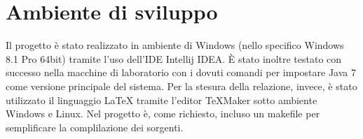 %
%
%

\section{Ambiente di sviluppo}
Il progetto \`{e} stato realizzato in ambiente di Windows (nello specifico Windows 8.1 Pro 64bit) tramite l'uso dell'IDE Intellij IDEA. \`{E} stato inoltre testato con successo nella macchine di laboratorio con i dovuti comandi per impostare Java 7 come versione principale del sistema.
Per la stesura della relazione, invece, \`{e} stato utilizzato il linguaggio \LaTeX{} tramite l'editor \TeX Maker sotto ambiente Windows e Linux.
Nel progetto \`{e}, come richiesto, incluso un makefile per semplificare la complilazione dei sorgenti. 
